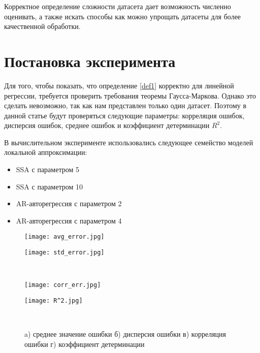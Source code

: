 \documentclass[a4paper,14pt]{extarticle}
\numberwithin{equation}{section}
\begin{document}
Корректное определение сложности датасета дает возможность численно оценивать, а также искать способы как можно упрощать датасеты для более качественной обработки.

\section{Постановка эксперимента}
Для того, чтобы показать, что определение \ref{def1} корректно для линейной регрессии, требуется проверить требования теоремы Гаусса-Маркова. Однако это сделать невозможно, так как нам представлен только один датасет. Поэтому в данной статье будут проверяться следующие параметры: корреляция ошибок, дисперсия ошибок, среднее ошибок и коэффициент детерминации $R^2$.  


В вычислительном эксперименте использовались следующее семейство моделей локальной аппроксимации:
\begin{itemize}
	\item SSA с параметром 5
	\item SSA с параметром 10
	\item AR-авторегрессия с параметром 2
	\item AR-авторегрессия с параметром 4
\end{itemize}

\begin{figure}[h!]
	
	\begin{minipage}{0.5\linewidth}
		\texttt{[image: avg\_error.jpg]} 
	\end{minipage}
	\hfill
	\begin{minipage}{0.5\linewidth}
		\texttt{[image: std\_error.jpg]}
	\end{minipage}\\
	\begin{minipage}{0.5\linewidth}
		\texttt{[image: corr\_err.jpg]}
	\end{minipage}
	\hfill
	\begin{minipage}{0.5\linewidth}
		\texttt{[image: R^2.jpg]}
	\end{minipage}\\
	
	\caption{a) среднее значение ошибки б) дисперсия ошибки
		в) корреляция ошибки г) коэффициент детерминации}
\end{figure}
\end{document}
